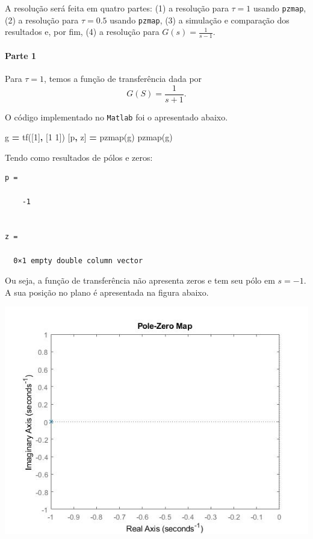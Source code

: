 \documentclass[
]{book}
\newenvironment{Shaded}{\begin{snugshade}}{\end{snugshade}}
\newcommand{\FloatTok}[1]{\textcolor[rgb]{0.00,0.00,0.81}{#1}}
\newcommand{\NormalTok}[1]{#1}
\newcommand{\OperatorTok}[1]{\textcolor[rgb]{0.81,0.36,0.00}{\textbf{#1}}}
\newcommand{\VariableTok}[1]{\textcolor[rgb]{0.00,0.00,0.00}{#1}}
\theoremstyle{definition}
\theoremstyle{definition}
\theoremstyle{definition}
\theoremstyle{remark}
\begin{document}
A resolução será feita em quatro partes: (1) a resolução para \(\tau = 1\) usando \texttt{pzmap}, (2) a resolução para \(\tau = 0.5\) usando \texttt{pzmap}, (3) a simulação e comparação dos resultados e, por fim, (4) a resolução para \(G(s) =\frac {1}{s-1}\).

\hypertarget{parte-1}{%
\paragraph*{Parte 1}\label{parte-1}}

Para \(\tau = 1\), temos a função de transferência dada por
\[
G(S)= \frac {1}{s+1}.
\]

O código implementado no \texttt{Matlab} foi o apresentado abaixo.

\begin{Shaded}
\begin{Highlighting}[]
\VariableTok{g} \OperatorTok{=} \VariableTok{tf}\NormalTok{([}\FloatTok{1}\NormalTok{]}\OperatorTok{,}\NormalTok{ [}\FloatTok{1} \FloatTok{1}\NormalTok{])}
\NormalTok{[}\VariableTok{p}\OperatorTok{,} \VariableTok{z}\NormalTok{] }\OperatorTok{=} \VariableTok{pzmap}\NormalTok{(}\VariableTok{g}\NormalTok{)}
\VariableTok{pzmap}\NormalTok{(}\VariableTok{g}\NormalTok{)}
\end{Highlighting}
\end{Shaded}

Tendo como resultados de pólos e zeros:

\begin{verbatim}
p =

    -1


z =

  0×1 empty double column vector
\end{verbatim}

Ou seja, a função de transferência não apresenta zeros e tem seu pólo em \(s = -1\). A sua posição no plano é apresentada na figura abaixo.

\includegraphics{Imagens/Lab2/tau1.jpg}
\end{document}
